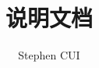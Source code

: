 \usepackage{amsmath, amssymb}
\usepackage{ctex}
\usepackage{bm}
\usepackage[table, xcdraw]{xcolor}
\usepackage{algorithm2e}
\usepackage{mathptmx}
\title{说明文档}
\author{Stephen CUI}
\usepackage[
    left=2.45cm,
    right=2.45cm,
    top=2.77cm,
    bottom=2.77cm
]{geometry}

\usepackage{hyperref}